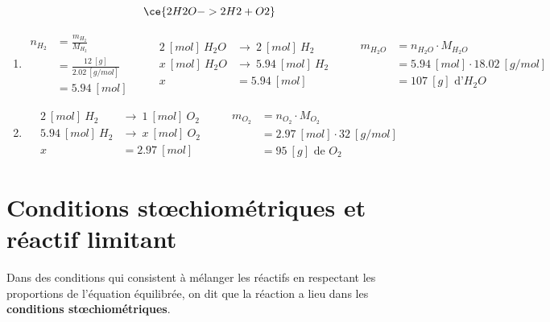 \documentclass[
  11pt,
  a4paper,
  openany]{book}
\begin{document}
\begin{Answer}

\[ \ce{2 H2O -> 2 H2 + O2} \]

\begin{enumerate}
\def\labelenumi{\arabic{enumi}.}
\item
  \[ \begin{split}
    n_{H_{2}} &= \frac{m_{H_{2}}}{M_{H_{2}}} \\
    &= \frac{12\ [g]}{2.02\ [g/mol]} \\
    &= 5.94\ [mol]
    \end{split}
    \qquad
    \begin{split}
    2\ [mol]\ H_2O &\rightarrow\ 2\ [mol]\ H_2 \\
    x\ [mol]\ H_2O &\rightarrow\ 5.94\ [mol]\ H_2 \\
    x &= 5.94\ [mol]
    \end{split}
    \qquad
    \begin{split}
    m_{H_2O} &= n_{H_2O} \cdot M_{H_2O} \\
    &= 5.94\ [mol] \cdot 18.02\ [g/mol] \\
    &= 107\ [g] \text{ d'} H_2O
    \end{split} \]
\item
  \[ \begin{split}
    2\ [mol]\ H_2 &\rightarrow\ 1\ [mol]\ O_2 \\
    5.94\ [mol]\ H_2 &\rightarrow\ x\ [mol]\ O_2 \\
    x &= 2.97\ [mol]
    \end{split}
    \qquad
    \begin{split}
    m_{O_2} &= n_{O_2} \cdot M_{O_2} \\
    &= 2.97\ [mol] \cdot 32\ [g/mol] \\
    &= 95\ [g] \text{ de } O_2
    \end{split} \]
\end{enumerate}

\end{Answer}

\section{Conditions stœchiométriques et réactif limitant}\label{conditions-stux153chiomuxe9triques-et-ruxe9actif-limitant}

Dans des conditions qui consistent à mélanger les réactifs en respectant les proportions de l'équation équilibrée, on dit que la réaction a lieu dans les \textbf{conditions stœchiométriques}.
\end{document}
